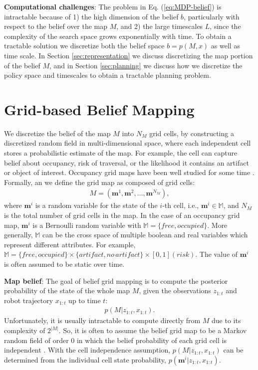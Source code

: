 \documentclass[letterpaper, 10 pt, conference]{ieeeconf}  %
\newcommand{\ph}[1]{{\textbf{#1}:}} %
\newcommand{\todo}[1]{{\color{red} #1 }} %
\begin{document}
\ph{Computational challenges}
The problem in Eq. (\ref{eq:MDP-belief}) is intractable because of 1) the high dimension of the belief $b$, particularly with respect to the belief over the map $M$, and 2) the large timescales $L$, since the complexity of the search space grows exponentially with time.  To obtain a tractable solution we discretize both the belief space $b=p(M,x)$ as well as time scale.  In Section \ref{sec:representation} we discuss discretizing the map portion of the belief $M$, and in Section \ref{sec:planning} we discuss how we discretize the policy space and timescales to obtain a tractable planning problem.

\section{Grid-based Belief Mapping} \label{sec:grid_representation}

We discretize the belief of the map $M$ into $N_M$ grid cells, by constructing a discretized random field in multi-dimensional space, where each independent cell stores a probabilistic estimate of the map.  For example, the cell can capture belief about occupancy, risk of traversal, or the likelihood it contains an artifact or object of interest.  Occupancy grid maps have been well studied for some time \cite{moravec1985high,elfes1990stochastic}.
%
Formally, an we define the grid map as composed of grid cells:
\begin{align}
  M = (\mathbf{m}^1, \mathbf{m}^2, \dots, \mathbf{m}^{N_M}),
\end{align}
where $\mathbf{m}^i$ is a random variable for the state of the $i$-th cell,
i.e., $\mathbf{m}^i \in \mathbb{M}$, and
$N_M$ is the total number of grid cells in the map.
In the case of an occupancy grid map, $\mathbf{m}^i$ is a Bernoulli random variable with $\mathbb{M} = \{free, occupied\}$.  More generally, $\mathbb{M}$ can be the cross space of multiple boolean and real variables which represent different attributes.  For example, $\mathbb{M} = \{free, occupied\}\times\{artifact, no\, artifact\}\times [0,1] (risk)$.
The value of $\mathbf{m}^i$ is often assumed to be static over time.

\ph{Map belief} The goal of belief grid mapping is to compute the posterior probability of the state of the whole map $M$, given the observations $z_{1:t}$ and robot trajectory $x_{1:t}$ up to time $t$:
\begin{align}
  p(M | z_{1:t}, x_{1:t}).
\end{align}
Unfortunately, it is usually intractable to compute directly from $M$ due to its complexity of $2^{|M|}$.
So, it is often to assume the belief grid map to be a Markov random field of order 0 in which the belief probability of each grid cell is independent \cite{TBF05,elfes1990stochastic}.
With the cell independence assumption, $p(M | z_{1:t}, x_{1:t})$ can be determined from the individual cell state probability, $p(\mathbf{m}^i | z_{1:t}, x_{1:t})$.
\end{document}
